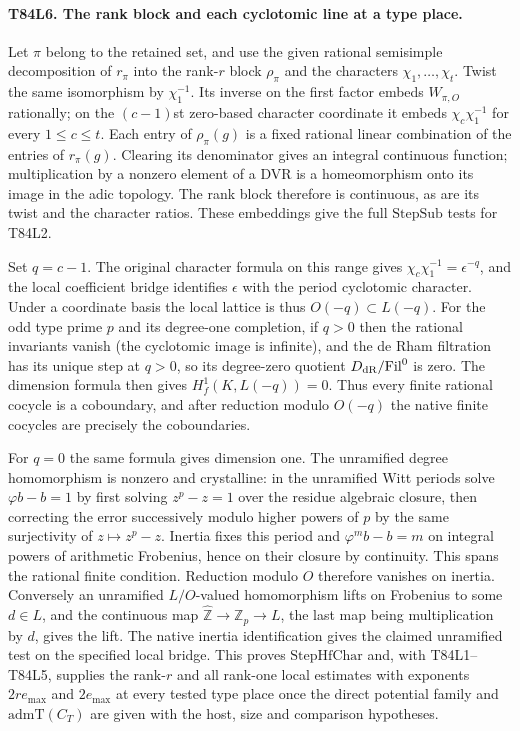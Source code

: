 \paragraph{T84L6. The rank block and each cyclotomic line at a type place.}
Let $\pi$ belong to the retained set, and use the given rational
semisimple decomposition of $r_\pi$ into the rank-$r$ block
$\rho_\pi$ and the characters $\chi_1,\ldots,\chi_t$. Twist
the same isomorphism by $\chi_1^{-1}$. Its inverse on the first
factor embeds $W_{\pi,O}$ rationally; on the $(c-1)$st
zero-based character coordinate it embeds
$\chi_c\chi_1^{-1}$ for every $1\le c\le t$. Each entry
of $\rho_\pi(g)$ is a fixed rational linear combination of the
entries of $r_\pi(g)$. Clearing its denominator gives an
integral continuous function; multiplication by a nonzero
element of a DVR is a homeomorphism onto its image in the
adic topology. The rank block therefore is continuous, as are
its twist and the character ratios. These embeddings give the
full $\mathrm{StepSub}$ tests for T84L2.

Set $q=c-1$. The original character formula on this range gives
$\chi_c\chi_1^{-1}=\epsilon^{-q}$, and the local coefficient
bridge identifies $\epsilon$ with the period cyclotomic
character. Under a coordinate basis the local lattice is thus
$O(-q)\subset L(-q)$. For the odd type prime $p$ and its
degree-one completion, if $q>0$ then the rational invariants
vanish (the cyclotomic image is infinite), and the de Rham
filtration has its unique step at $q>0$, so its degree-zero
quotient $D_{\rm dR}/{\rm Fil}^0$ is zero. The dimension formula
then gives $H^1_f(K,L(-q))=0$. Thus every finite rational
cocycle is a coboundary, and after reduction modulo $O(-q)$
the native finite cocycles are precisely the coboundaries.

For $q=0$ the same formula gives dimension one. The unramified
degree homomorphism is nonzero and crystalline: in the unramified
Witt periods solve $\varphi b-b=1$ by first solving
$z^p-z=1$ over the residue algebraic closure, then correcting
the error successively modulo higher powers of $p$ by the
same surjectivity of $z\mapsto z^p-z$. Inertia fixes this
period and $\varphi^m b-b=m$ on integral powers of arithmetic
Frobenius, hence on their closure by continuity. This spans
the rational finite condition. Reduction modulo $O$ therefore
vanishes on inertia. Conversely an unramified $L/O$-valued
homomorphism lifts on Frobenius to some $d\in L$, and the
continuous map $\widehat{\mathbb Z}\to\mathbb Z_p\to L$,
the last map being multiplication by $d$, gives the lift.
The native inertia identification gives the claimed unramified
test on the specified local bridge. This proves
$\mathrm{StepHfChar}$ and, with T84L1--T84L5, supplies the
rank-$r$ and all rank-one local estimates with exponents
$2r e_{\max}$ and $2 e_{\max}$ at every tested type place
once the direct potential family and $\mathrm{admT}(C_T)$
are given with the host, size and comparison hypotheses.
